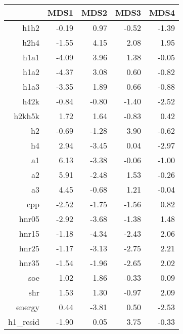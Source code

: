 \begin{table}[ht]
\centering
\begin{tabular}{rrrrr}
  \hline
 & MDS1 & MDS2 & MDS3 & MDS4 \\ 
  \hline
h1h2 & -0.19 & 0.97 & -0.52 & -1.39 \\ 
  h2h4 & -1.55 & 4.15 & 2.08 & 1.95 \\ 
  h1a1 & -4.09 & 3.96 & 1.38 & -0.05 \\ 
  h1a2 & -4.37 & 3.08 & 0.60 & -0.82 \\ 
  h1a3 & -3.35 & 1.89 & 0.66 & -0.88 \\ 
  h42k & -0.84 & -0.80 & -1.40 & -2.52 \\ 
  h2kh5k & 1.72 & 1.64 & -0.83 & 0.42 \\ 
  h2 & -0.69 & -1.28 & 3.90 & -0.62 \\ 
  h4 & 2.94 & -3.45 & 0.04 & -2.97 \\ 
  a1 & 6.13 & -3.38 & -0.06 & -1.00 \\ 
  a2 & 5.91 & -2.48 & 1.53 & -0.26 \\ 
  a3 & 4.45 & -0.68 & 1.21 & -0.04 \\ 
  cpp & -2.52 & -1.75 & -1.56 & 0.82 \\ 
  hnr05 & -2.92 & -3.68 & -1.38 & 1.48 \\ 
  hnr15 & -1.18 & -4.34 & -2.43 & 2.06 \\ 
  hnr25 & -1.17 & -3.13 & -2.75 & 2.21 \\ 
  hnr35 & -1.54 & -1.96 & -2.65 & 2.02 \\ 
  soe & 1.02 & 1.86 & -0.33 & 0.09 \\ 
  shr & 1.53 & 1.30 & -0.97 & 2.09 \\ 
  energy & 0.44 & -3.81 & 0.50 & -2.53 \\ 
  h1\_resid & -1.90 & 0.05 & 3.75 & -0.33 \\ 
   \hline
\end{tabular}
\end{table}
